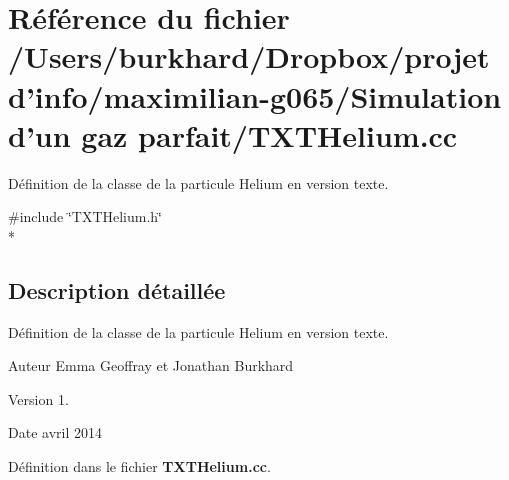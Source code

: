 \section{Référence du fichier /\+Users/burkhard/\+Dropbox/projet d'info/maximilian-\/g065/\+Simulation d'un gaz parfait/\+T\+X\+T\+Helium.cc}
\label{_t_x_t_helium_8cc}


Définition de la classe de la particule Helium en version texte.  


{\ttfamily \#include \char`\"{}T\+X\+T\+Helium.\+h\char`\"{}}\\*


\subsection{Description détaillée}
Définition de la classe de la particule Helium en version texte. 

\begin{DoxyAuthor}{Auteur}
Emma Geoffray et Jonathan Burkhard 
\end{DoxyAuthor}
\begin{DoxyVersion}{Version}
1. 
\end{DoxyVersion}
\begin{DoxyDate}{Date}
avril 2014 
\end{DoxyDate}


Définition dans le fichier {\bf T\+X\+T\+Helium.\+cc}.

